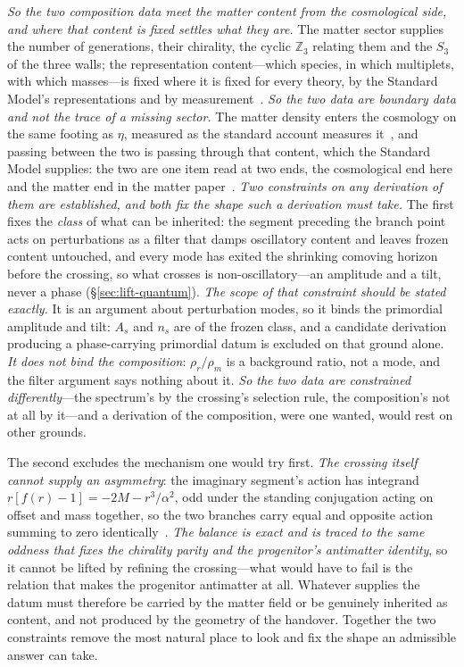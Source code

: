 \documentclass[11pt,a4paper]{article}
\theoremstyle{plain}
\theoremstyle{definition}
\theoremstyle{remark}
\begin{document}
\emph{So the two composition data meet the matter content from the cosmological side, and where that content is fixed settles what they are.} The
matter sector supplies the number of generations, their chirality, the cyclic $\mathbb{Z}_3$ relating them and the $S_3$ of the three walls; the representation content---which species, in which multiplets, with which masses---is fixed where it is fixed for every theory, by the Standard Model's representations and by measurement~\cite{JanzenMatter, JanzenBoundary}. \emph{So the two data are boundary data and not the trace of a missing sector.} The matter density enters the cosmology on the same footing as $\eta$, measured as the standard account measures it~\cite{JanzenCRcosmology}, and passing between the two is passing through that content, which the Standard Model supplies: the two are one item read at two ends, the cosmological end here and the matter end in the matter paper~\cite{JanzenMatter}.  \emph{Two constraints on any derivation of them are established, and both fix the shape such a derivation must take.}
The first fixes the \emph{class} of what can be inherited: the segment preceding the branch point acts on
perturbations as a filter that damps oscillatory content and leaves frozen content untouched, and every mode
has exited the shrinking comoving horizon before the crossing, so what crosses is non-oscillatory---an amplitude
and a tilt, never a phase (\S\ref{sec:lift-quantum}). \emph{The scope of that constraint should be stated exactly.} It is an argument about perturbation modes, so it binds the primordial amplitude and tilt: $A_s$ and $n_s$ are of the frozen class, and a candidate derivation producing a phase-carrying primordial datum is excluded on that ground alone. \emph{It does not bind the composition}: $\rho_r/\rho_m$ is a background ratio, not a mode, and the filter argument says nothing about it. \emph{So the two data are constrained differently}---the spectrum's by the crossing's selection rule, the composition's not at all by it---and a derivation of the composition, were one wanted, would rest on other grounds.

The second excludes the mechanism one would try first. \emph{The crossing itself cannot supply an asymmetry}:
the imaginary segment's action has integrand $r[f(r)-1]=-2M-r^{3}/\alpha^{2}$, odd under the standing
conjugation acting on offset and mass together, so the two branches carry equal and opposite action summing to
zero identically~\cite{JanzenCosmogenesis}. \emph{The balance is exact and is traced to the same oddness that
fixes the chirality parity and the progenitor's antimatter identity}, so it cannot be lifted by refining the
crossing---what would have to fail is the relation that makes the progenitor antimatter at all. Whatever
supplies the datum must therefore be carried by the matter field or be genuinely inherited as content, and not
produced by the geometry of the handover. Together the two constraints remove the most natural place to look and fix the shape an admissible answer can take.
\end{document}
